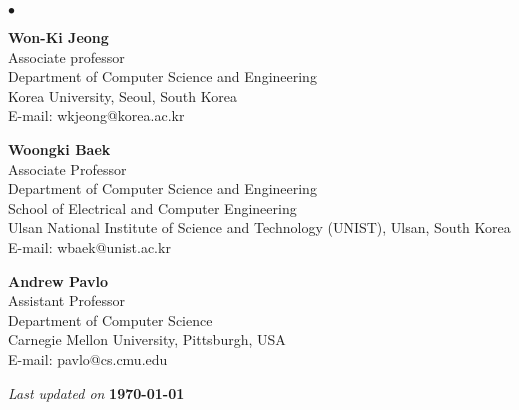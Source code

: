\documentclass[margin,line]{res}
\newenvironment{list2}{
  \begin{list}{$\bullet$}{%
      \setlength{\itemsep}{0in}
      \setlength{\parsep}{0in} \setlength{\parskip}{0in}
      \setlength{\topsep}{0in} \setlength{\partopsep}{0in}
      \setlength{\leftmargin}{0.2in}}}{\end{list}}
\begin{document}
\begin{resume}
{\begin{list2}

\item {\bf Won-Ki Jeong}\\
Associate professor \\
Department of Computer Science and Engineering \\
Korea University, Seoul, South Korea \\
E-mail: wkjeong@korea.ac.kr \\

\item {\bf Woongki Baek}\\
Associate Professor\\
Department of Computer Science and Engineering \\
School of Electrical and Computer Engineering\\
Ulsan National Institute of Science and Technology (UNIST), Ulsan, South Korea \\
E-mail: wbaek@unist.ac.kr \\

\item {\bf Andrew Pavlo}\\
Assistant Professor\\
Department of Computer Science\\
Carnegie Mellon University, Pittsburgh, USA\\
E-mail: pavlo@cs.cmu.edu\\
\end{list2}


\noindent
{\em Last updated on} {\bf \today}

\vspace*{.5in}

\noindent

\end{resume}
\end{document}
